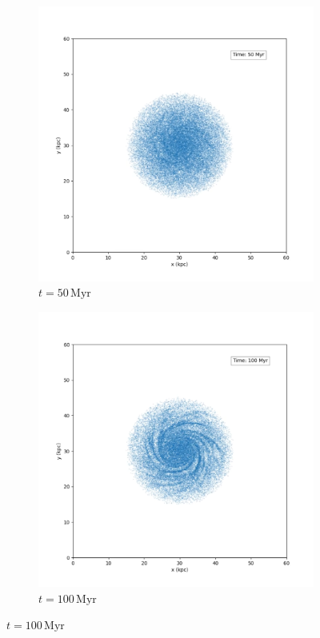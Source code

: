 \begin{figure}[!ht]
    \centering
    \begin{subfigure}[b]{0.45\textwidth}
        \centering
        \includegraphics[width=\textwidth]{chapters/results/img/pm-galaxy/50myr.png}
        \caption{$t=50\,\text{Myr}$}
        \label{fig:spiral-galaxy-evolution-pm-sub1}
    \end{subfigure}
    \hfill
    \begin{subfigure}[b]{0.45\textwidth}
        \centering
        \includegraphics[width=\textwidth]{chapters/results/img/pm-galaxy/100myr.png}
        \caption{$t=100\,\text{Myr}$}
        \label{fig:spiral-galaxy-evolution-pm-sub2}
    \end{subfigure}


\end{figure}

